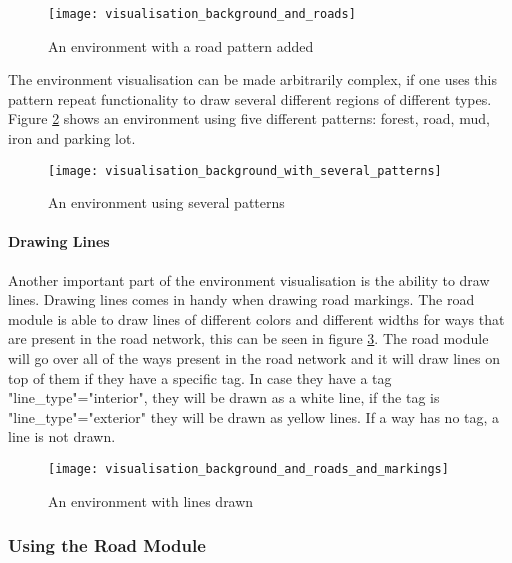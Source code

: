 \begin{figure}[h!]
  \centering
    \texttt{[image: visualisation\_background\_and\_roads]}
    \caption{An environment with a road pattern added \label{fig:visualisation_background_and_roads} }
\end{figure}

The environment visualisation can be made arbitrarily complex, if one uses this pattern repeat functionality to draw several different regions of different types. Figure \ref{fig:visualisation_background_with_several_patterns} shows an environment using five different patterns: forest, road, mud, iron and parking lot.

\begin{figure}[h!]
  \centering
    \texttt{[image: visualisation\_background\_with\_several\_patterns]}
    \caption{An environment using several patterns \label{fig:visualisation_background_with_several_patterns} }
\end{figure}

\paragraph{Drawing Lines}

Another important part of the environment visualisation is the ability to draw lines. Drawing lines comes in handy when drawing road markings. The road module is able to draw lines of different colors and different widths for ways that are present in the road network, this can be seen in figure \ref{fig:visualisation_background_and_roads_and_markings}. The road module will go over all of the ways present in the road network and it will draw lines on top of them if they have a specific tag. In case they have a tag "line\_type"="interior", they will be drawn as a white line, if the tag is "line\_type"="exterior" they will be drawn as yellow lines. If a way has no tag, a line is not drawn. 

\begin{figure}[h!]
  \centering
    \texttt{[image: visualisation\_background\_and\_roads\_and\_markings]}
    \caption{An environment with lines drawn \label{fig:visualisation_background_and_roads_and_markings} }
\end{figure}

\subsubsection{Using the Road Module}

